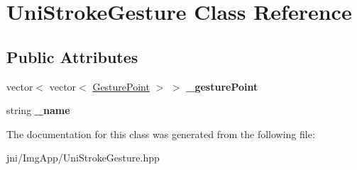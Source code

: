 \hypertarget{classUniStrokeGesture}{\section{\-Uni\-Stroke\-Gesture \-Class \-Reference}
\label{classUniStrokeGesture}
}
\subsection*{\-Public \-Attributes}
\begin{DoxyCompactItemize}
\item 
\hypertarget{classUniStrokeGesture_a8cc074d20ec291f5339c6633457ac6d9}{vector$<$ vector$<$ \hyperlink{classGesturePoint}{\-Gesture\-Point} $>$ $>$ {\bfseries \-\_\-gesture\-Point}}\label{classUniStrokeGesture_a8cc074d20ec291f5339c6633457ac6d9}

\item 
\hypertarget{classUniStrokeGesture_adc3efd8fae4f164168e5e767d576c661}{string {\bfseries \-\_\-name}}\label{classUniStrokeGesture_adc3efd8fae4f164168e5e767d576c661}

\end{DoxyCompactItemize}


\-The documentation for this class was generated from the following file\-:\begin{DoxyCompactItemize}
\item 
jni/\-Img\-App/\-Uni\-Stroke\-Gesture.\-hpp\end{DoxyCompactItemize}
